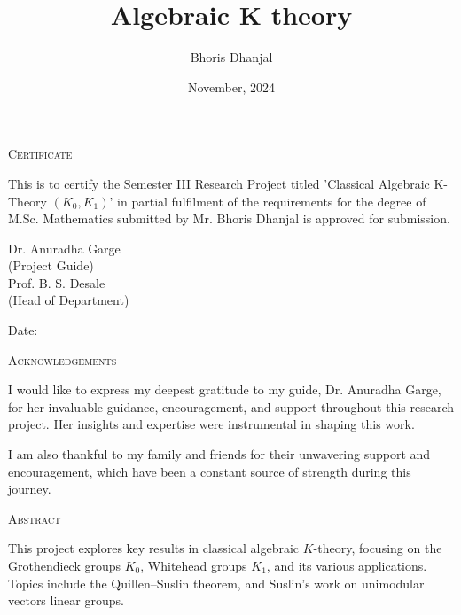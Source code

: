 \documentclass[12pt]{report}
\title{Algebraic K theory}
\author{Bhoris Dhanjal}
\date{November, 2024}
\makeatletter
\numberwithin{equation}{section}
\newcommand\frontmatter{%
	\cleardoublepage
	\pagenumbering{roman}}
\newcommand\mainmatter{%
	\cleardoublepage
	\pagenumbering{arabic}}
\makeatother
\begin{document}
	

	\frontmatter
	
	\begin{center}
		

		{\LARGE {\textsc{Certificate}}}\\[2.5cm]
	\end{center}
	\normalsize This is to certify the Semester III Research Project titled 'Classical Algebraic K-Theory $(K_0,K_1)$' in partial fulfilment of the requirements for the degree of M.Sc. Mathematics  submitted by Mr. Bhoris Dhanjal is approved for submission.
	

	
	\vfill
	
	
	\begin{flushright}
		Dr. Anuradha Garge\\
		(Project Guide)\\[1.5cm]
		Prof. B. S. Desale\\
		(Head of Department)\\
	\end{flushright}
	
	\begin{flushleft}
		Date:
	\end{flushleft}
	\clearpage
	
	\begin{center}
	
	
	{\LARGE {\textsc{Acknowledgements}}}\\[1cm]
\end{center}
I would like to express my deepest gratitude to my guide, Dr. Anuradha Garge, for her invaluable guidance, encouragement, and support throughout this research project. Her insights and expertise were instrumental in shaping this work.

I am also thankful to my family and friends for their unwavering support and encouragement, which have been a constant source of strength during this journey.
	\clearpage
	\begin{center}
		
		
		{\LARGE {\textsc{Abstract}}}\\[1cm]
	\end{center}
This project explores key results in classical algebraic \( K \)-theory, focusing on the Grothendieck groups \( K_0 \), Whitehead groups \( K_1 \), and its various applications. Topics include the Quillen–Suslin theorem, and Suslin's work on unimodular vectors linear groups.
\clearpage
	\tableofcontents
	\mainmatter
	
\end{document}
